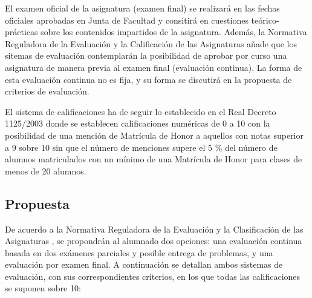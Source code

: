 \documentclass[a4paper,12pt,twoside]{article}
\begin{document}
El examen oficial de la asignatura (examen final) se realizará en las fechas oficiales aprobadas en Junta de Facultad y consitirá en cuestiones teórico-prácticas sobre los contenidos impartidos de la asignatura. Además, la Normativa Reguladora de la Evaluación y la Calificación de las Asignaturas \cite{normregul} añade que los sitemas de evaluación contemplarán la posibilidad de aprobar por curso una asignatura de manera previa al examen final (evaluación continua). La forma de esta evaluación continua no es fija, y su forma se discutirá en la propuesta de criterios de evaluación.

El sistema de calificaciones ha de seguir lo establecido en el Real Decreto 1125/2003 \cite{dec_ects} donde se establecen calificaciones numéricas de 0 a 10 con la posibilidad de una mención de Matrícula de Honor a aquellos con notas superior a 9 sobre 10 sin que el número de menciones
supere el 5 \% del número de alumnos matriculados con un mínimo de una Matrícula de Honor para clases de menos de 20 alumnos.

\subsection{Propuesta}

De acuerdo a la Normativa Reguladora de la Evaluación y la Clasificación de las Asignaturas \cite{normregul}, se propondrán al alumnado dos opciones: una evaluación continua basada en dos exámenes parciales y posible entrega de problemas, y una evaluación por examen final. A continuación se detallan ambos sistemas de evaluación, con sus correspondientes criterios, en los que todas las calificaciones se suponen sobre 10:
\end{document}
